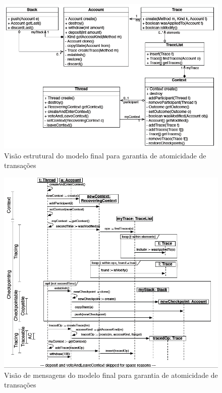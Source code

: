 \begin{landscape}
\begin{figure}
	\centering
	\includegraphics[width=500px]{img/p87_class_final_model.png}
	\caption{Visão estrutural do modelo final para garantia de atomicidade de transações}\label{fig:p87_class_final_model}
\end{figure}
\end{landscape}

\begin{landscape}
\begin{figure}
	\centering
	\includegraphics[width=500px]{img/p87_sequence_final_model.png}
	\caption{Visão de mensagens do modelo final para garantia de atomicidade de transações}\label{fig:p87_sequence_final_model}
\end{figure}
\end{landscape}


